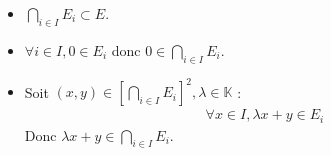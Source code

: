 \documentclass[../main.tex]{subfiles}
\begin{document}
\begin{itemize}
    \item $\bigcap\limits_{i\in I} E_i \subset E$.
    \item $\forall i \in I, 0 \in E_i$ donc $0 \in \bigcap\limits_{i\in I} E_i$.
    \item Soit $(x, y) \in \left[\bigcap\limits_{i \in I} E_i \right]^2, \lambda \in \mathbb{K}$ : 
    \begin{align*}
        \forall x \in I, \lambda x + y \in E_i
    \end{align*}
    Donc $\lambda x + y \in \bigcap\limits_{i\in I} E_i$.
\end{itemize}
\end{document}
